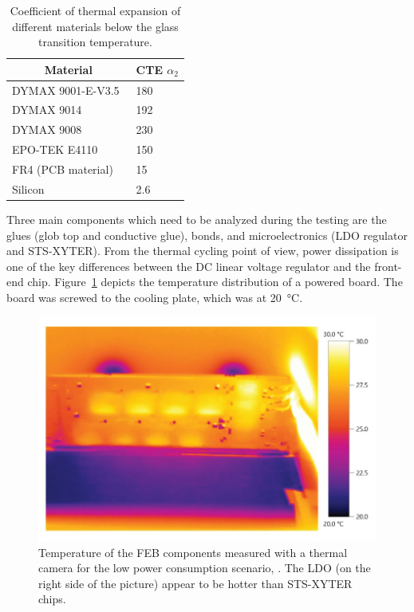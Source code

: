 \begin{table}[!h]
\begin{center}
\caption{Coefficient of thermal expansion of different materials below the glass transition temperature.}
\begin{tabular}{ll}
\hline
\multicolumn{1}{c}{Material} & \multicolumn{1}{c}{CTE $\alpha_{2}$} [\si{\micro\metre\per\metre\per\celsius]}] \\ \hline
DYMAX 9001-E-V3.5~\cite{9001}            & 180                                  \\
DYMAX 9014~\cite{9014}                   & 192                                  \\
DYMAX 9008~\cite{9008}                   & 230                                  \\
EPO-TEK E4110~\cite{4110}                & 150                                  \\ \hline
FR4 (\gls{PCB} material)~\cite{FR4}                          & 15                                   \\
Silicon~\cite{Si}                           & 2.6                                 
\end{tabular}
\label{TCE}
\end{center}
\end{table}

Three main components which need to be analyzed during the testing are the glues (glob top and conductive glue), bonds, and microelectronics (\gls{LDO} regulator and STS-XYTER). From the thermal cycling point of view, power dissipation is one of the key differences between the DC linear voltage regulator and the front-end chip. Figure~\ref{fig_temperatures_camera} depicts the temperature distribution of a powered board. The board was screwed to the cooling plate, which was at \SI{20}{\celsius}.

\begin{figure}[!h]
\centering
\includegraphics[width=0.6\columnwidth]{Chapter4/images/feb_thermal.jpg}
\caption{Temperature of the \gls{FEB} components measured with a thermal camera for the low power consumption scenario, \cite{leo_electronics}. The \gls{LDO} (on the right side of the picture) appear to be hotter than STS-XYTER chips.}
\label{fig_temperatures_camera}
\end{figure}



